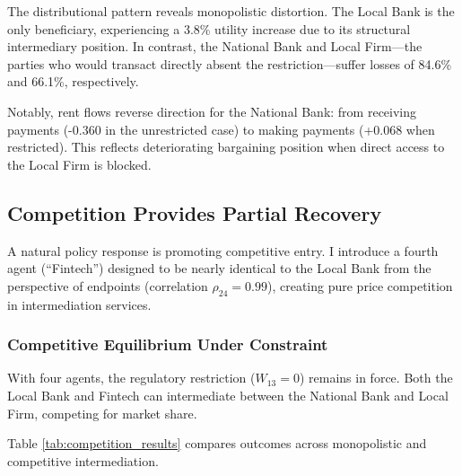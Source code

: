 \documentclass[12pt]{article}
\begin{document}
The distributional pattern reveals monopolistic distortion. The Local Bank is the only beneficiary, experiencing a 3.8\% utility increase due to its structural intermediary position. In contrast, the National Bank and Local Firm---the parties who would transact directly absent the restriction---suffer losses of 84.6\% and 66.1\%, respectively.

Notably, rent flows reverse direction for the National Bank: from receiving payments (-0.360 in the unrestricted case) to making payments (+0.068 when restricted). This reflects deteriorating bargaining position when direct access to the Local Firm is blocked.

\subsection{Competition Provides Partial Recovery}
\label{sec:competition_results}

A natural policy response is promoting competitive entry. I introduce a fourth agent (``Fintech'') designed to be nearly identical to the Local Bank from the perspective of endpoints (correlation $\rho_{24} = 0.99$), creating pure price competition in intermediation services.

\subsubsection{Competitive Equilibrium Under Constraint}

With four agents, the regulatory restriction ($W_{13} = 0$) remains in force. Both the Local Bank and Fintech can intermediate between the National Bank and Local Firm, competing for market share.

Table \ref{tab:competition_results} compares outcomes across monopolistic and competitive intermediation.
\end{document}
